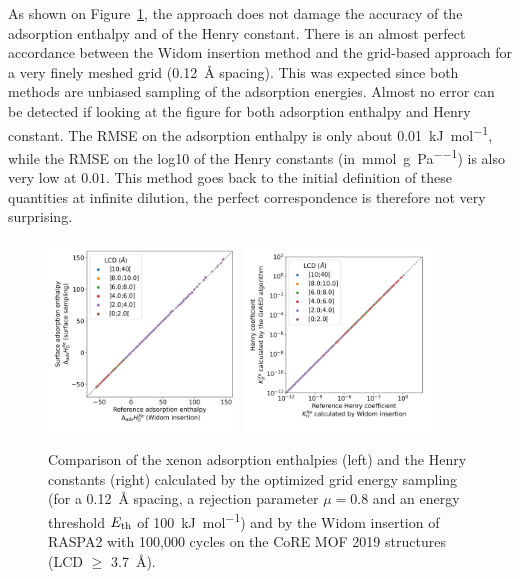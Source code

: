 \documentclass[main]{subfiles}
\begin{document}
As shown on Figure~\ref{fgr:grid_widom}, the approach does not damage the accuracy of the adsorption enthalpy and of the Henry constant. There is an almost perfect accordance between the Widom insertion method and the grid-based approach for a very finely meshed grid (\SI{0.12}{\angstrom} spacing). This was expected since both methods are unbiased sampling of the adsorption energies. Almost no error can be detected if looking at the figure for both adsorption enthalpy and Henry constant. The RMSE on the adsorption enthalpy is only about \SI{0.01}{\kilo\joule\per\mole}, while the RMSE on the log10 of the Henry constants (in~\si{\milli\mole\per\gram\per\pascal}) is also very low at $0.01$. This method goes back to the initial definition of these quantities at infinite dilution, the perfect correspondence is therefore not very surprising. 

\begin{figure}[ht]
  \centering
    \includegraphics[width=0.45\textwidth]{figures/3-fastsim/H_Xe_widom_vs_H_Xe_grid_overview.jpg}
    \includegraphics[width=0.45\textwidth]{figures/3-fastsim/K_Xe_widom_vs_K_Xe_grid_overview.jpg}
    \caption{Comparison of the xenon adsorption enthalpies (left) and the Henry constants (right) calculated by the optimized grid energy sampling (for a \SI{0.12}{\angstrom} spacing, a rejection parameter $\mu=0.8$ and an energy threshold $E_{\text{th}}$ of \SI{100}{\kilo\joule\per\mole}) and by the Widom insertion of RASPA2 with 100,000 cycles on the CoRE MOF 2019 structures (LCD $\geq$ \SI{3.7}{\angstrom}). }\label{fgr:grid_widom}
\end{figure}
\end{document}
